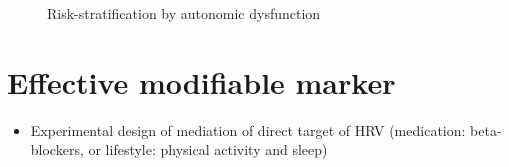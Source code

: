 \documentclass[
  a4paper,
  headsepline=true,
  open=any]{scrbook}
\providecommand{\tightlist}{%
  \setlength{\itemsep}{0pt}\setlength{\parskip}{0pt}}\usepackage{longtable,booktabs,array}
\begin{document}
\begin{figure}

\begin{minipage}[t]{\linewidth}

{\centering 


\caption{Risk-stratification by autonomic dysfunction}

}

\end{minipage}%

\end{figure}

\hypertarget{effective-modifiable-marker}{%
\section{Effective modifiable
marker}\label{effective-modifiable-marker}}

\begin{itemize}
\tightlist
\item
  Experimental design of mediation of direct target of HRV (medication:
  beta-blockers, or lifestyle: physical activity and sleep)
\end{itemize}
\end{document}
